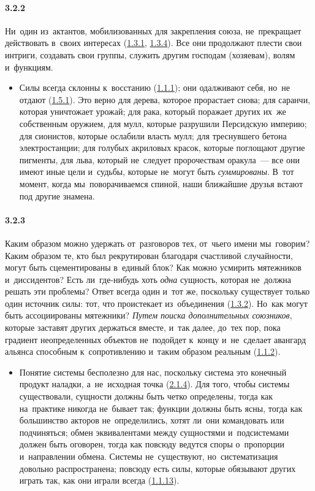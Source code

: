 \paragraph{3.2.2}\hypertarget{par:3.2.2}{} Ни~один из~актантов, мобилизованных для закрепления союза, не~прекращает действовать в~своих интересах (\hyperlink{par:1.3.1}{1.3.1}, \hyperlink{par:1.3.4}{1.3.4}). Все они продолжают плести свои интриги, создавать свои группы, служить другим господам (хозяевам), волям и~функциям. 
	\begin{itemize}
	\item 
	Силы всегда склонны к~восстанию (\hyperlink{par:1.1.1}{1.1.1}); они одалживают себя, но~не отдают (\hyperlink{par:1.5.1}{1.5.1}). Это верно для дерева, которое прорастает снова; для саранчи, которая уничтожает урожай; для рака, который поражает других их~же собственным оружием, для мулл, которые разрушили Персидскую империю; для сионистов, которые ослабили власть мулл; для треснувшего бетона электростанции; для голубых акриловых красок, которые поглощают другие пигменты, для льва, который не~следует пророчествам оракула~--- все они имеют иные цели и~судьбы, которые не~могут быть {\itshape суммированы}. В~тот момент, когда мы~поворачиваемся спиной, наши ближайшие друзья встают под другие знамена.
	\end{itemize}

\paragraph{3.2.3}\hypertarget{par:3.2.3}{} Каким образом можно удержать от~разговоров тех, от~чьего имени мы~говорим? Каким образом те, кто был рекрутирован благодаря счастливой случайности, могут быть сцементированы в~единый блок? Как можно усмирить мятежников и~диссидентов? Есть ли~где-нибудь хоть {\itshape одна} сущность, которая не~должна решать эти проблемы? Ответ всегда один и~тот же, поскольку существует только один источник силы: тот, что проистекает из~объединения (\hyperlink{par:1.3.2}{1.3.2}). Но~как могут быть ассоциированы мятежники? {\itshape Путем поиска дополнительных союзников}, которые заставят других держаться вместе, и~так далее, до~тех пор, пока градиент неопределенных объектов не~подойдет к~концу и~не~сделает авангард альянса способным к~сопротивлению и~таким образом реальным (\hyperlink{par:1.1.2}{1.1.2}).
	\begin{itemize}
	\item 
	Понятие системы бесполезно для нас, поскольку система это конечный продукт наладки, а~не~исходная точка (\hyperlink{par:2.1.4}{2.1.4}). Для того, чтобы системы существовали, сущности должны быть четко определены, тогда как на~практике никогда не~бывает так; функции должны быть ясны, тогда как большинство акторов не~определились, хотят ли~они командовать или подчиняться; обмен эквивалентами между сущностями и~подсистемами должен быть оговорен, тогда как повсюду ведутся споры о~пропорции и~направлении обмена. Системы не~существуют, но~систематизация довольно распространена; повсюду есть силы, которые обязывают других играть так, как они играли всегда (\hyperlink{par:1.1.13}{1.1.13}). 
	\end{itemize}

